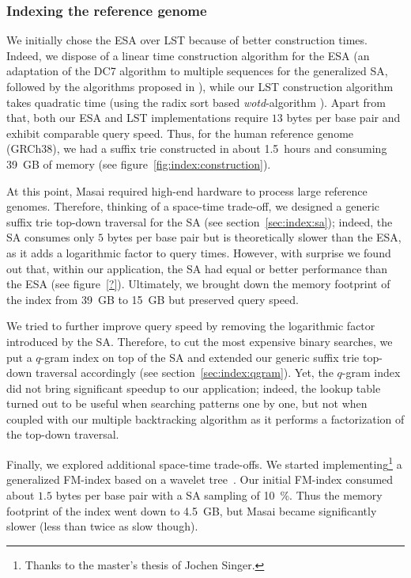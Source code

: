 \subsubsection{Indexing the reference genome}

We initially chose the ESA over LST because of better construction times.
Indeed, we dispose of a linear time construction algorithm for the ESA (an adaptation of the DC7 algorithm \citep{Dementiev2008} to multiple sequences \citep{Weese2013} for the generalized SA, followed by the algorithms proposed in \citep{Kasai2001,Abouelhoda2004}), while our LST construction algorithm takes quadratic time (using the radix sort based \emph{wotd}-algorithm \citep{Giegerich1999}).
Apart from that, both our ESA and LST implementations require $13$ bytes per base pair and exhibit comparable query speed.
Thus, for the human reference genome (GRCh38), we had a suffix trie constructed in about 1.5~hours and consuming 39~GB of memory (see figure~\ref{fig:index:construction}).

At this point, Masai required high-end hardware to process large reference genomes.
Therefore, thinking of a space-time trade-off, we designed a generic suffix trie top-down traversal for the SA (see section~\ref{sec:index:sa});
indeed, the SA consumes only $5$ bytes per base pair but is theoretically slower than the ESA, as it adds a logarithmic factor to query times.
However, with surprise we found out that, within our application, the SA had equal or better performance than the ESA (see figure~\ref{?}).
Ultimately, we brought down the memory footprint of the index from 39~GB to 15~GB but preserved query speed.

We tried to further improve query speed by removing the logarithmic factor introduced by the SA.
Therefore, to cut the most expensive binary searches, we put a $q$-gram index on top of the SA and extended our generic suffix trie top-down traversal accordingly (see section~\ref{sec:index:qgram}).
Yet, the $q$-gram index did not bring significant speedup to our application;
indeed, the lookup table turned out to be useful when searching patterns one by one, but not when coupled with our multiple backtracking algorithm as it performs a factorization of the top-down traversal.

Finally, we explored additional space-time trade-offs.
We started implementing\footnote{Thanks to the master's thesis of Jochen Singer.} a generalized FM-index based on a wavelet tree~\citep{Grossi2003}.
Our initial FM-index consumed about $1.5$ bytes per base pair with a SA sampling of 10~\%.
Thus the memory footprint of the index went down to 4.5~GB, but Masai became significantly slower (less than twice as slow though).

